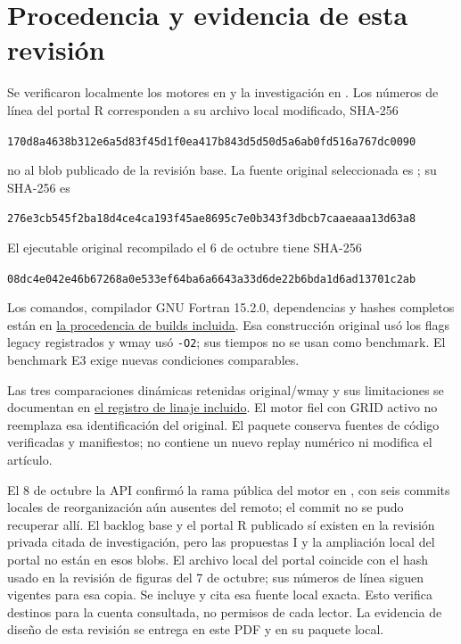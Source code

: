\chapter{Procedencia y evidencia de esta revisión}
\label{anexo:procedencia}

Se verificaron localmente los motores en  y la investigación en
. Los números de línea del portal R corresponden a su archivo local modificado, SHA-256\par
{\footnotesize\texttt{170d8a4638b312e6a5d83f45d1f0ea417b843d5d50d5a6ab0fd516a767dc0090}}\par
no al blob publicado de la revisión base. La fuente original seleccionada es ;
su SHA-256 es\par
{\footnotesize\texttt{276e3cb545f2ba18d4ce4ca193f45ae8695c7e0b343f3dbcb7caaeaaa13d63a8}}\par
El ejecutable original recompilado el 6 de octubre tiene SHA-256\par
{\footnotesize\texttt{08dc4e042e46b67268a0e533ef64ba6a6643a33d6de22b6bda1d6ad13701c2ab}}\par
Los comandos, compilador GNU Fortran 15.2.0, dependencias y hashes completos están en
\href{run:../evidence/lineage/builds/README.md}{la procedencia de builds incluida}.
Esa construcción original usó los flags legacy registrados y wmay usó \texttt{-O2};
sus tiempos no se usan como benchmark. El benchmark E3 exige nuevas condiciones comparables.

Las tres comparaciones dinámicas retenidas original/wmay y sus limitaciones se documentan en
\href{run:../evidence/ENGINE-CLOSEOUT.md}{el registro de linaje incluido}. El motor fiel con
GRID activo no reemplaza esa identificación del original. El paquete conserva fuentes de
código verificadas y manifiestos; no contiene un nuevo replay numérico ni modifica el artículo.

El 8 de octubre la API confirmó la rama pública del motor en , con seis
commits locales de reorganización aún ausentes del remoto; el commit  no
se pudo recuperar allí. El backlog base y el portal R publicado sí existen en la revisión privada citada
de investigación, pero las propuestas I y la ampliación local del portal no están en esos blobs.
El archivo local del portal coincide con el hash usado en la revisión de figuras del 7 de octubre;
sus números de línea siguen vigentes para esa copia. Se incluye y cita esa fuente local exacta. Esto verifica destinos para la cuenta consultada, no permisos de cada lector.
La evidencia de diseño de esta revisión se entrega en este PDF y en su paquete local.

